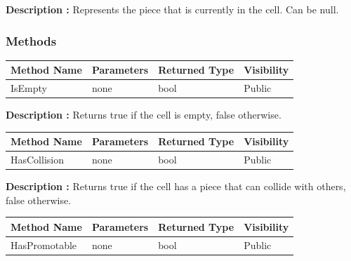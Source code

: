 \documentclass[12pt]{article}
\begin{document}
\textbf{Description :} Represents the piece that is currently in the cell. Can be null. 

\subsubsection{Methods}

\begin{table}[H]
    \begin{tabular}{|l|l|l|l|}
    \hline
    \rowcolor[HTML]{EFEFEF} 
    \cellcolor[HTML]{EFEFEF}\textbf{Method Name} & \textbf{Parameters}    & \textbf{Returned Type} & \textbf{Visibility} \\ \hline
    IsEmpty                                      & none                   & bool                   & Public              \\ \hline
    \end{tabular}
\end{table}

\textbf{Description :} Returns true if the cell is empty, false otherwise.  

\begin{table}[H]
    \begin{tabular}{|l|l|l|l|}
    \hline
    \rowcolor[HTML]{EFEFEF} 
    \cellcolor[HTML]{EFEFEF}\textbf{Method Name} & \textbf{Parameters}     & \textbf{Returned Type} & \textbf{Visibility} \\ \hline
    HasCollision                                 & none                    & bool                   & Public              \\ \hline
    \end{tabular}
\end{table}

\textbf{Description :} Returns true if the cell has a piece that can collide with others, false otherwise.   

\begin{table}[H]
    \begin{tabular}{|l|l|l|l|}
    \hline
    \rowcolor[HTML]{EFEFEF} 
    \cellcolor[HTML]{EFEFEF}\textbf{Method Name} & \textbf{Parameters}     & \textbf{Returned Type} & \textbf{Visibility} \\ \hline
    HasPromotable                                & none                    & bool                   & Public              \\ \hline
    \end{tabular}
\end{table}
\end{document}
